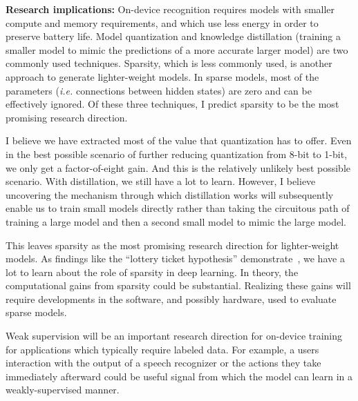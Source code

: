 {\bf Research implications:} On-device recognition requires models with smaller
compute and memory requirements, and which use less energy in order to preserve
battery life. Model quantization and knowledge distillation (training a smaller
model to mimic the predictions of a more accurate larger model) are two
commonly used techniques. Sparsity, which is less commonly used, is another
approach to generate lighter-weight models. In sparse models, most of the
parameters (\emph{i.e.} connections between hidden states) are zero and can be
effectively ignored. Of these three techniques, I predict sparsity to be the
most promising research direction.

I believe we have extracted most of the value that quantization has to offer.
Even in the best possible scenario of further reducing quantization from 8-bit
to 1-bit, we only get a factor-of-eight gain. And this is the relatively
unlikely best possible scenario. With distillation, we still have a lot to
learn. However, I believe uncovering the mechanism through which
distillation works will subsequently enable us to train small models
directly rather than taking the circuitous path of training a large model and
then a second small model to mimic the large model.

This leaves sparsity as the most promising research direction for
lighter-weight models. As findings like the ``lottery ticket hypothesis''
demonstrate~\citep{frankle2018lottery}, we have a lot to learn about the role
of sparsity in deep learning. In theory, the computational gains from sparsity
could be substantial. Realizing these gains will require developments in the
software, and possibly hardware, used to evaluate sparse models.

Weak supervision will be an important research direction for on-device training
for applications which typically require labeled data. For example, a users
interaction with the output of a speech recognizer or the actions they take
immediately afterward could be useful signal from which the model can learn in
a weakly-supervised manner.

